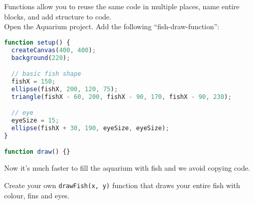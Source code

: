 
\newpage
{}

\begin{exercisebox}[adjusted title=Functions]
Functions allow you to reuse the same code in multiple places,
name entire blocks, and add structure to code.\\

Open the Aquarium project. Add the following ``fish-draw-function'':

\begin{lstlisting}[language=JavaScript]
function setup() {
  createCanvas(400, 400);
  background(220);

  // basic fish shape
  fishX = 150;
  ellipse(fishX, 200, 120, 75);
  triangle(fishX - 60, 200, fishX - 90, 170, fishX - 90, 230);

  // eye
  eyeSize = 15;
  ellipse(fishX + 30, 190, eyeSize, eyeSize);
}

function draw() {}
\end{lstlisting}

Now it's much faster to fill the aquarium with fish and we avoid copying code.

 Create your own \texttt{drawFish(x, y)} function that draws your entire fish with colour, fins and eyes.

\end{exercisebox}

